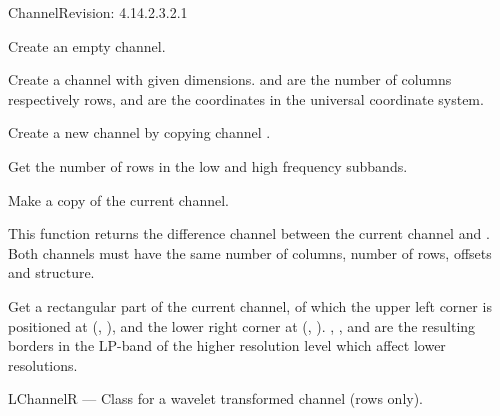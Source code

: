 \begin{manpage}{\libtitle}{Channel}{$ $Revision: 4.14.2.3.2.1 $ $}
\subtitle{Declaration}

    Create an empty channel.

    Create a channel with given dimensions.  and  are the
    number of columns respectively rows,  and  are the
    coordinates in the universal coordinate system.

    Create a new channel by copying channel .


\subtitle{Public \\ Operations}

    Get the number of rows in the low and high frequency subbands.


\subtitle{Virtual \\ Operations}

    Make a copy of the current channel.

    This function returns the difference channel between the current channel
    and . Both channels must have the same number of columns,
    number of rows, offsets and structure.

    Get a rectangular part of the current channel, of which the upper left
    corner is positioned at (, ), and the lower right corner
    at (, ). , ,  and
     are the resulting borders in the LP-band of the higher
    resolution level which affect lower resolutions.


\separator

\subtitle{Name}
    LChannelR --- Class for a wavelet transformed channel (rows only).


\end{manpage}
